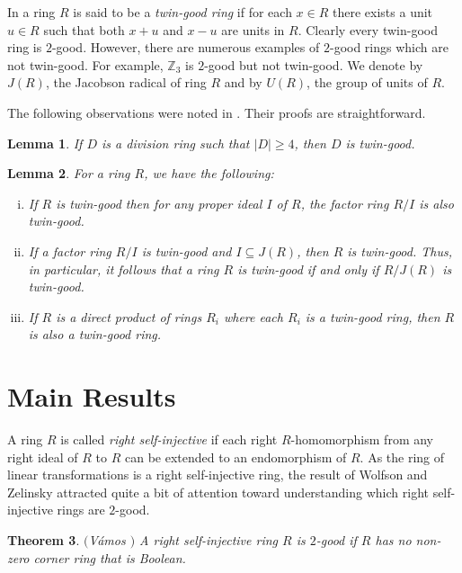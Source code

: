 \documentclass{amsart}
\newtheorem{theorem}{Theorem}
\newtheorem{lemma}[theorem]{Lemma}
\begin{document}
\bigskip 

\noindent In \cite{Perkins} a ring $R$ is said to be a {\it twin-good ring} if for each $x\in R$ there exists a unit $u\in R$ such that both $x+u$ and $x-u$ are units in $R$. Clearly every twin-good ring is $2$-good. However, there are numerous examples of $2$-good rings which are not twin-good. For example, $\mathbb Z_3$ is $2$-good but not twin-good. We denote by $J(R)$, the Jacobson radical of ring $R$ and by $U(R)$, the group of units of $R$. 

The following observations were noted in \cite{Perkins}. Their proofs are straightforward.

\begin{lemma} \label{divring}
If $D$ is a division ring such that $|D|\ge 4$, then $D$ is twin-good.
\end{lemma}

\begin{lemma} \label{radtwin}
For a ring $R$, we have the following:
\begin{enumerate}[(i)]
\item If $R$ is twin-good then for any proper ideal $I$ of $R$, the factor ring $R/I$ is also twin-good.
\item If a factor ring $R/I$ is twin-good and $I\subseteq J(R)$, then $R$ is twin-good. Thus, in particular, it follows that a ring $R$ is twin-good if and only if $R/J(R)$ is twin-good. 
\item If $R$ is a direct product of rings $R_i$ where each $R_i$ is a twin-good ring, then $R$ is also a twin-good ring.
\end{enumerate}
\end{lemma}

\section{Main Results}

\noindent A ring $R$ is called \textit{right self-injective} if each right $R$-homomorphism from any right ideal of $R$ to $R$ can be extended to an endomorphism of $R$. As the ring of linear transformations is a right self-injective ring, the result of Wolfson and Zelinsky attracted quite a bit of attention toward understanding which right self-injective rings are $2$-good.

\begin{theorem}$($V\'{a}mos \cite{Vamos}$)$
A right self-injective ring $R$ is $2$-good if $R$ has no non-zero corner ring that is Boolean. 
\end{theorem}
\end{document}
